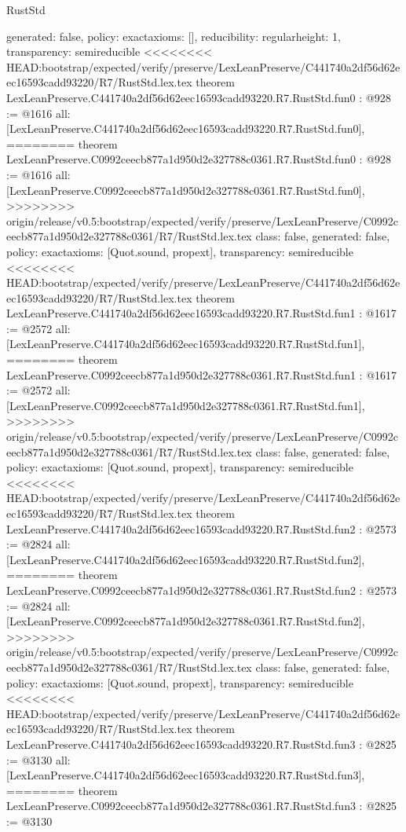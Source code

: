 \begin{lexlean}{RustStd}
\begin{coremodule}
{\begin{coremodule}
{{{  generated: false,
  policy: exact{axioms: []},
  reducibility: regular{height: 1},
  transparency: semireducible
}
<<<<<<<< HEAD:bootstrap/expected/verify/preserve/LexLeanPreserve/C441740a2df56d62eec16593cadd93220/R7/RustStd.lex.tex
theorem LexLeanPreserve.C441740a2df56d62eec16593cadd93220.R7.RustStd.fun0 : @928 := @1616 {
  all: [LexLeanPreserve.C441740a2df56d62eec16593cadd93220.R7.RustStd.fun0],
========
theorem LexLeanPreserve.C0992ceecb877a1d950d2e327788c0361.R7.RustStd.fun0 : @928 := @1616 {
  all: [LexLeanPreserve.C0992ceecb877a1d950d2e327788c0361.R7.RustStd.fun0],
>>>>>>>> origin/release/v0.5:bootstrap/expected/verify/preserve/LexLeanPreserve/C0992ceecb877a1d950d2e327788c0361/R7/RustStd.lex.tex
  class: false,
  generated: false,
  policy: exact{axioms: [Quot.sound, propext]},
  transparency: semireducible
}
<<<<<<<< HEAD:bootstrap/expected/verify/preserve/LexLeanPreserve/C441740a2df56d62eec16593cadd93220/R7/RustStd.lex.tex
theorem LexLeanPreserve.C441740a2df56d62eec16593cadd93220.R7.RustStd.fun1 : @1617 := @2572 {
  all: [LexLeanPreserve.C441740a2df56d62eec16593cadd93220.R7.RustStd.fun1],
========
theorem LexLeanPreserve.C0992ceecb877a1d950d2e327788c0361.R7.RustStd.fun1 : @1617 := @2572 {
  all: [LexLeanPreserve.C0992ceecb877a1d950d2e327788c0361.R7.RustStd.fun1],
>>>>>>>> origin/release/v0.5:bootstrap/expected/verify/preserve/LexLeanPreserve/C0992ceecb877a1d950d2e327788c0361/R7/RustStd.lex.tex
  class: false,
  generated: false,
  policy: exact{axioms: [Quot.sound, propext]},
  transparency: semireducible
}
<<<<<<<< HEAD:bootstrap/expected/verify/preserve/LexLeanPreserve/C441740a2df56d62eec16593cadd93220/R7/RustStd.lex.tex
theorem LexLeanPreserve.C441740a2df56d62eec16593cadd93220.R7.RustStd.fun2 : @2573 := @2824 {
  all: [LexLeanPreserve.C441740a2df56d62eec16593cadd93220.R7.RustStd.fun2],
========
theorem LexLeanPreserve.C0992ceecb877a1d950d2e327788c0361.R7.RustStd.fun2 : @2573 := @2824 {
  all: [LexLeanPreserve.C0992ceecb877a1d950d2e327788c0361.R7.RustStd.fun2],
>>>>>>>> origin/release/v0.5:bootstrap/expected/verify/preserve/LexLeanPreserve/C0992ceecb877a1d950d2e327788c0361/R7/RustStd.lex.tex
  class: false,
  generated: false,
  policy: exact{axioms: [Quot.sound, propext]},
  transparency: semireducible
}
<<<<<<<< HEAD:bootstrap/expected/verify/preserve/LexLeanPreserve/C441740a2df56d62eec16593cadd93220/R7/RustStd.lex.tex
theorem LexLeanPreserve.C441740a2df56d62eec16593cadd93220.R7.RustStd.fun3 : @2825 := @3130 {
  all: [LexLeanPreserve.C441740a2df56d62eec16593cadd93220.R7.RustStd.fun3],
========
theorem LexLeanPreserve.C0992ceecb877a1d950d2e327788c0361.R7.RustStd.fun3 : @2825 := @3130 {
}}}}}}}
\end{coremodule}}
\end{coremodule}
\end{lexlean}
